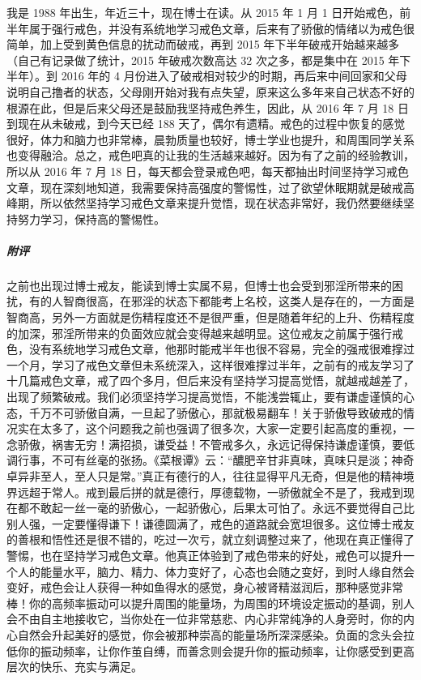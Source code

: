 \begin{case}
    我是 1988 年出生，年近三十，现在博士在读。从 2015 年 1 月 1 日开始戒色，前半年属于强行戒色，并没有系统地学习戒色文章，后来有了骄傲的情绪以为戒色很简单，加上受到黄色信息的扰动而破戒，再到 2015 年下半年破戒开始越来越多（自己有记录做了统计，2015 年破戒次数高达 32 次之多，都是集中在 2015 年下半年）。到 2016 年的 4 月份进入了破戒相对较少的时期，再后来中间回家和父母说明自己撸者的状态，父母刚开始对我有点失望，原来这么多年来自己状态不好的根源在此，但是后来父母还是鼓励我坚持戒色养生，因此，从 2016 年 7 月 18 日到现在从未破戒，到今天已经 188 天了，偶尔有遗精。戒色的过程中恢复的感觉很好，体力和脑力也非常棒，晨勃质量也较好，博士学业也提升，和周围同学关系也变得融洽。总之，戒色吧真的让我的生活越来越好。因为有了之前的经验教训，所以从 2016 年 7 月 18 日，每天都会登录戒色吧，每天都抽出时间坚持学习戒色文章，现在深刻地知道，我需要保持高强度的警惕性，过了欲望休眠期就是破戒高峰期，所以依然坚持学习戒色文章来提升觉悟，现在状态非常好，我仍然要继续坚持努力学习，保持高的警惕性。
    \subparagraph{附评} 之前也出现过博士戒友，能读到博士实属不易，但博士也会受到邪淫所带来的困扰，有的人智商很高，在邪淫的状态下都能考上名校，这类人是存在的，一方面是智商高，另外一方面就是伤精程度还不是很严重，但是随着年纪的上升、伤精程度的加深，邪淫所带来的负面效应就会变得越来越明显。这位戒友之前属于强行戒色，没有系统地学习戒色文章，他那时能戒半年也很不容易，完全的强戒很难撑过一个月，学习了戒色文章但未系统深入，这样很难撑过半年，之前有的戒友学习了十几篇戒色文章，戒了四个多月，但后来没有坚持学习提高觉悟，就越戒越差了，出现了频繁破戒。我们必须坚持学习提高觉悟，不能浅尝辄止，要有谦虚谨慎的心态，千万不可骄傲自满，一旦起了骄傲心，那就极易翻车！关于骄傲导致破戒的情况实在太多了，这个问题我之前也强调了很多次，大家一定要引起高度的重视，一念骄傲，祸害无穷！满招损，谦受益！不管戒多久，永远记得保持谦虚谨慎，要低调行事，不可有丝毫的张扬。《菜根谭》云：“醲肥辛甘非真味，真味只是淡；神奇卓异非至人，至人只是常。”真正有德行的人，往往显得平凡无奇，但是他的精神境界远超于常人。戒到最后拼的就是德行，厚德载物，一骄傲就全不是了，我戒到现在都不敢起一丝一毫的骄傲心，一起骄傲心，后果太可怕了。永远不要觉得自己比别人强，一定要懂得谦下！谦德圆满了，戒色的道路就会宽坦很多。这位博士戒友的善根和悟性还是很不错的，吃过一次亏，就立刻调整过来了，他现在真正懂得了警惕，也在坚持学习戒色文章。他真正体验到了戒色带来的好处，戒色可以提升一个人的能量水平，脑力、精力、体力变好了，心态也会随之变好，到时人缘自然会变好，戒色会让人获得一种如鱼得水的感觉，身心被肾精滋润后，那种感觉非常棒！你的高频率振动可以提升周围的能量场，为周围的环境设定振动的基调，别人会不由自主地接收它，当你处在一位非常慈悲、内心非常纯净的人身旁时，你的内心自然会升起美好的感觉，你会被那种崇高的能量场所深深感染。负面的念头会拉低你的振动频率，让你作茧自缚，而善念则会提升你的振动频率，让你感受到更高层次的快乐、充实与满足。
\end{case}

